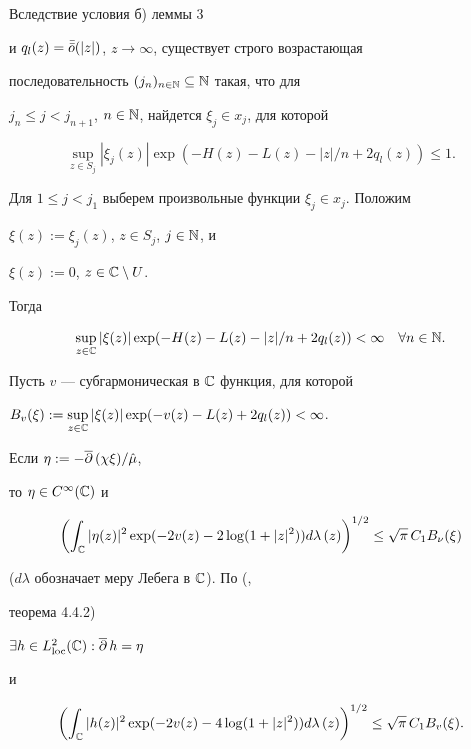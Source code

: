 \begin{pf}
Вследствие условия б) леммы 3 


и $q_l(z)=\Bar{\Bar o}(|z|)$, $z\to\infty$, существует строго возрастающая 


последовательность $(j_n)_{n\in\Bbb N}\subseteq\Bbb N$ такая, что для 


$j_n\le j<j_{n+1}$, $n\in\Bbb N$, найдется $\xi_j\in x_j$, для которой 


$$ 


\sup_{z\in S_j}|\xi_j(z)|\exp(-H(z)-L(z)-|z|/n+2q_l(z))\le 1. 


$$ 


Для $1\le j<j_1$ выберем произвольные функции $\xi_j\in x_j$. Положим 


$\xi(z):=\xi_j(z)$, $z\in S_j$, $j\in\Bbb N$, и 


$\xi(z):=0$, $z\in\Bbb C\setminus U$. 


Тогда 


$$ 


\sup_{z\in\Bbb C}|\xi(z)|\exp(-H(z)-L(z)-|z|/n+2q_l(z))<\infty 


\quad \forall n\in\Bbb N. 


$$ 


Пусть $v$ --- субгармоническая в $\Bbb C$ функция, для которой 


$B_v(\xi):=\sup\limits_{z\in\Bbb C}|\xi(z)|\exp(-v(z)-L(z)+2q_l(z)) 


<\infty$. 


Если $\eta :=-\overline\partial\,(\chi\xi)/\Hat\mu$,


то $\eta\in C^\infty(\Bbb C)$ и 


$$ 


\biggl(\int_{\Bbb 


C}|\eta(z)|^2\exp(-2v(z)-2\log(1+|z|^2))d\lambda\,(z)\biggr)^{1/2} 


\le \sqrt\pi\,C_1B_\nu(\xi) 


$$ 


($d\lambda$ обозначает меру Лебега в $\Bbb C$). По (\cite{Her}, 


теорема 4.4.2)


$\exists h\in L^2_{\text{loc}}(\Bbb C):\overline\partial\, h=\eta$


и 


$$ 


\biggl(\int_{\Bbb 


C}|h(z)|^2\exp(-2v(z)-4\log(1+|z|^2))d\lambda\,(z)\biggr)^{1/2} 


\le \sqrt\pi \, C_1 B_v(\xi).


$$ 



\end{pf}
